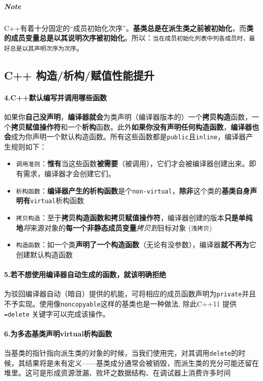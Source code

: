 \documentclass[UTF8,a4paper,12pt]{ctexbook}
\begin{document}
			\subparagraph{Note}  C++有着十分固定的“成员初始化次序”。\textbf{基类总是在派生类之前被初始化}，而\textbf{类的成员变量总是以其说明次序被初始化}。所以：\verb|当在成员初始化列表中列各成员时，最好总是以其声明次序为次序|。
		\subsection{C++ 构造/析构/赋值性能提升}
		\paragraph{4.C++默认编写并调用哪些函数} 如果你\textbf{自己没声明}，\textbf{编译器就会}为类声明（编译器版本的）一个\textbf{拷贝构造}函数，一个\textbf{拷贝赋值操作符}和一个\textbf{析构}函数。此外\textbf{如果你没有声明任何构造函数}，\textbf{编译器也会}成为你声明一个默认构造函数。所有这些函数都是\verb|public|且\verb|inline|，编译器产生规则如下：

			\begin{itemize}
				\item \verb|调用准则|：\textbf{惟有}当这些函数\textbf{被需要}（被调用），它们才会被编译器创建出来。即有需求，编译器才会创建它们。
				\item \verb|析构函数|：\textbf{编译器产生的析构函数}是个\verb|non-virtual|，\textbf{除非}这个类的\textbf{基类自身声明有}\verb|virtual|析构函数
				\item \verb|拷贝构造|：至于\textbf{拷贝构造函数和拷贝赋值操作符}，编译器创建的版本\textbf{只是单纯地}\textit{将}来源对象的\textbf{每一个非静态成员变量}\textit{拷贝到}目标对象 (\verb|浅拷贝|)
				\item \verb|构造函数|：如一个类\textbf{声明了一个构造函数}（无论有没参数），编译器\textbf{就不再为}它创建默认构造函数
			\end{itemize}
				
		\paragraph{5.若不想使用编译器自动生成的函数，就该明确拒绝} 为驳回编译器自动（暗自）提供的机能，可将相应的成员函数声明为\verb|private|并且不予实现。使用像\verb|noncopyable|这样的基类也是一种做法, 除此C++11 提供\verb|=delete| 关键字可以完成该操作。
			
		\paragraph{6.为多态基类声明virtual析构函数} 当基类的指针指向派生类的对象的时候，当我们使用完，对其调用\verb|delete|的时候，其结果将是未有定义——基类成分通常会被销毁，而派生类的充分可能还留在堆里。这可是形成资源泄漏、败坏之数据结构、在调试器上消费许多时间
			
\end{document}
